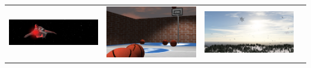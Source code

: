 \documentclass{beamer}
\begin{document}
\begin{frame}[fragile]{\CurrentSection}
\begin{block}{\CurrentSubSection}
\begin{table}[h!]
  \centering
  \begin{tabular}{ m{2cm} m{2cm} m{2cm} m{2cm} }
  
    \begin{minipage}{.23\textwidth}
      \includegraphics[width=\linewidth]{Figures/a}
    \end{minipage}
    &
        \begin{minipage}{.23\textwidth}
      \includegraphics[width=\linewidth]{Figures/b}
    \end{minipage}
    &     
    \begin{minipage}{.23\textwidth}
      \includegraphics[width=\linewidth]{Figures/c}

\end{minipage}
\end{tabular}
\end{table}
\end{block}
\end{frame}
\end{document}

